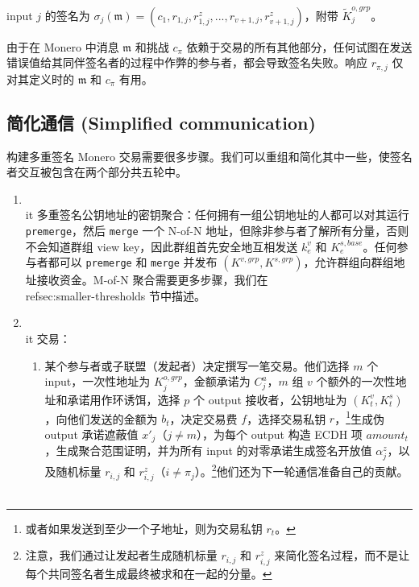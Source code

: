 input $j$ 的签名为 $\sigma_j(\mathfrak{m}) = (c_1,r_{1,j},r^{z}_{1,j},...,r_{v+1,j},r^{z}_{v+1,j})$，附带 $\tilde{K}^{o,grp}_j$。

由于在 Monero 中消息 $\mathfrak{m}$ 和挑战 $c_{\pi}$ 依赖于交易的所有其他部分，任何试图在发送错误值给其同伴签名者的过程中作弊的参与者，都会导致签名失败。响应 $r_{\pi,j}$ 仅对其定义时的 $\mathfrak{m}$ 和 $c_{\pi}$ 有用。


\subsection{简化通信 (Simplified communication)}
\label{sec:simplified-communication}

构建多重签名 Monero 交易需要很多步骤。我们可以重组和简化其中一些，使签名者交互被包含在两个部分共五轮中。
\begin{enumerate}
    \item {\\it 多重签名公钥地址的密钥聚合}：任何拥有一组公钥地址的人都可以对其运行 {\tt premerge}，然后 {\tt merge} 一个 N-of-N 地址，但除非参与者了解所有分量，否则不会知道群组 view key，因此群组首先安全地互相发送 $k^{v}_e$ 和 $K^{s,base}_e$。任何参与者都可以 {\tt premerge} 和 {\tt merge} 并发布 $(K^{v,grp},K^{s,grp})$，允许群组向群组地址接收资金。M-of-N 聚合需要更多步骤，我们在 \\ref{sec:smaller-thresholds} 节中描述。
    \item {\\it 交易}：
    \begin{enumerate}
        \item 某个参与者或子联盟（发起者）决定撰写一笔交易。他们选择 $m$ 个 input，一次性地址为 $K^{o,grp}_{j}$，金额承诺为 $C^a_j$，$m$ 组 $v$ 个额外的一次性地址和承诺用作环诱饵，选择 $p$ 个 output 接收者，公钥地址为 $(K^v_t,K^s_t)$，向他们发送的金额为 $b_t$，决定交易费 $f$，选择交易私钥 $r$，\footnote{或者如果发送到至少一个子地址，则为交易私钥 $r_{t}$。}生成伪 output 承诺遮蔽值 $x'_{j}$（$j \neq m$），为每个 output 构造 ECDH 项 $\mathit{amount}_t$，生成聚合范围证明，并为所有 input 的对零承诺生成签名开放值 $\alpha^z_j$，以及随机标量 $r_{i,j}$ 和 $r^z_{i,j}$（$i \neq \pi_j$）。\footnote{注意，我们通过让发起者生成随机标量 $r_{i,j}$ 和 $r^z_{i,j}$ 来简化签名过程，而不是让每个共同签名者生成最终被求和在一起的分量。}他们还为下一轮通信准备自己的贡献。\\\\


\end{enumerate}
\end{enumerate}
